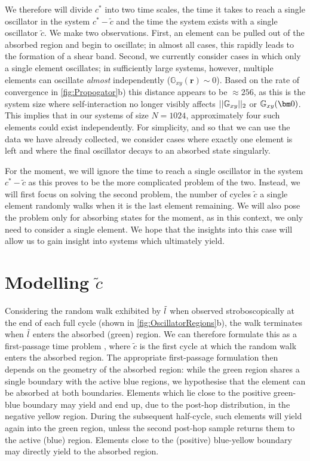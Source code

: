 We therefore will divide $c^*$ into two time scales, the time it takes to reach a single oscillator in the system $c^* - \tilde{c}$ and the time the system exists with a single oscillator $\tilde{c}$. We make two observations. First, an element can be pulled out of the absorbed region and begin to oscillate; in almost all cases, this rapidly leads to the formation of a shear band. Second, we currently consider cases in which only a single element oscillates; in sufficiently large systems, however, multiple elements can oscillate \emph{almost} independently ($\mathbb{G}_{xy}(\bm{r}) \sim 0$). Based on the rate of convergence in \cref{fig:Propogator}b) this distance appears to be $\approx 256$, as this is the system size where self-interaction no longer visibly affects $||\mathbb{G}_{xy}||_2$ or $\Origin$. This implies that in our systems of size $N=1024$, approximately four such elements could exist independently. For simplicity, and so that we can use the data we have already collected, we consider cases where exactly one element is left and where the final oscillator decays to an absorbed state singularly.

For the moment, we will ignore the time to reach a single oscillator in the system $c^* - \tilde{c}$ as this proves to be the more complicated problem of the two. Instead, we will first focus on solving the second problem, the number of cycles $\tilde{c}$ a single element randomly walks when it is the last element remaining. We will also pose the problem only for absorbing states for the moment, as in this context, we only need to consider a single element. We hope that the insights into this case will allow us to gain insight into systems which ultimately yield.

\section{Modelling \texorpdfstring{$\tilde{c}$}{c-tilde}}

Considering the random walk exhibited by $\tilde{l}$ when observed stroboscopically at the end of each full cycle (shown in \cref{fig:OscillatorRegions}b), the walk terminates when $\tilde{l}$ enters the absorbed (green) region. We can therefore formulate this as a first-passage time problem \cite{Redner_2001}, where $\tilde{c}$ is the first cycle at which the random walk enters the absorbed region. The appropriate first-passage formulation then depends on the geometry of the absorbed region: while the green region shares a single boundary with the active blue regions, we hypothesise that the element can be absorbed at both boundaries. Elements which lie close to the positive green-blue boundary may yield and end up, due to the post-hop distribution, in the negative yellow region. During the subsequent half-cycle, such elements will yield again into the green region, unless the second post-hop sample returns them to the active (blue) region. Elements close to the (positive) blue-yellow boundary may directly yield to the absorbed region.


